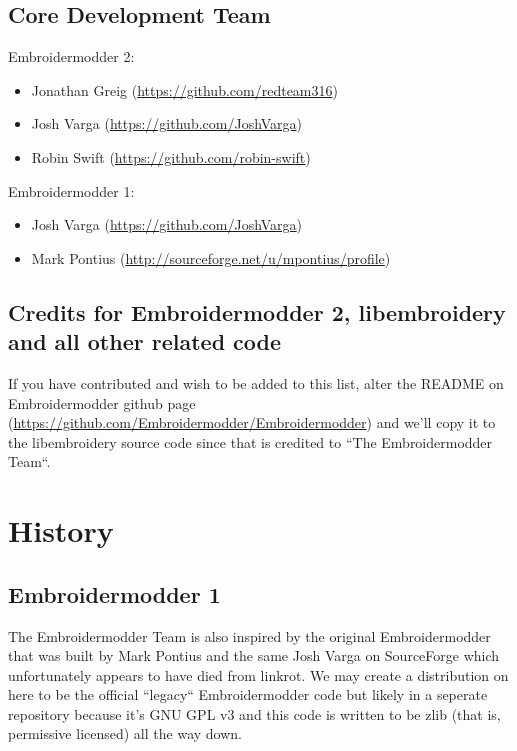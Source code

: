\documentclass[10pt]{report}
\begin{document}
\subsection{Core Development Team}

Embroidermodder 2:

\begin{itemize}
\item Jonathan Greig (\url{https://github.com/redteam316})
\item Josh Varga (\url{https://github.com/JoshVarga})
\item Robin Swift (\url{https://github.com/robin-swift})
\end{itemize}

Embroidermodder 1:

\begin{itemize}
\item Josh Varga (\url{https://github.com/JoshVarga})
\item Mark Pontius (\url{http://sourceforge.net/u/mpontius/profile})
\end{itemize}

\subsection{Credits for Embroidermodder 2, libembroidery and all other related code}

If you have contributed and wish to be added to this list, alter the  README on Embroidermodder
github page (\url{https://github.com/Embroidermodder/Embroidermodder}) and we'll copy it to the
libembroidery source code since that is credited to ``The Embroidermodder Team``.

\section{History}

\subsection{Embroidermodder 1}

The Embroidermodder Team is also inspired by the original Embroidermodder that
was built by Mark Pontius and the same Josh Varga on SourceForge which
unfortunately appears to have died from linkrot. We may create a distribution
on here to be the official ``legacy`` Embroidermodder code but likely in a
seperate repository because it's GNU GPL v3 and this code is written to be
zlib (that is, permissive licensed) all the way down.
\end{document}
